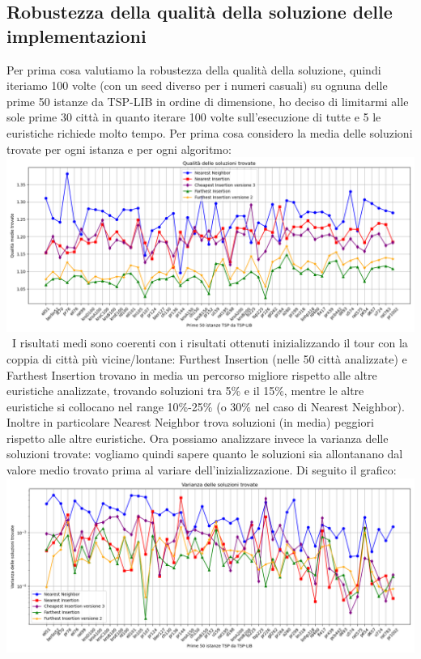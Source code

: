 \documentclass[a4paper,12pt]{report}
\begin{document}
\subsection{Robustezza della qualità della soluzione delle implementazioni}
Per prima cosa valutiamo la robustezza della qualità della soluzione, quindi iteriamo 100 volte (con un seed diverso per i numeri casuali) su ognuna delle prime 50 istanze da TSP-LIB in ordine di dimensione, ho deciso di limitarmi alle sole prime 30 città in quanto iterare 100 volte sull'esecuzione di tutte e 5 le euristiche richiede molto tempo. Per prima cosa considero la media delle soluzioni trovate per ogni istanza e per ogni algoritmo: \newline
\includegraphics[width=1\textwidth]{../Grafici/9.png} \
I risultati medi sono coerenti con i risultati ottenuti inizializzando il tour con la coppia di città più vicine/lontane: Furthest Insertion (nelle 50 città analizzate) e Farthest Insertion trovano in media un percorso migliore rispetto alle altre euristiche analizzate, trovando soluzioni tra 5\% e il 15\%, mentre le altre euristiche si collocano nel range 10\%-25\% (o 30\% nel caso di Nearest Neighbor). Inoltre in particolare Nearest Neighbor trova soluzioni (in media) peggiori rispetto alle altre euristiche. \newline 
Ora possiamo analizzare invece la varianza delle soluzioni trovate: vogliamo quindi sapere quanto le soluzioni sia allontanano dal valore medio trovato prima al variare dell'inizializzazione. Di seguito il grafico: \newline
\includegraphics[width=1\textwidth]{../Grafici/10.png} \
\end{document}
